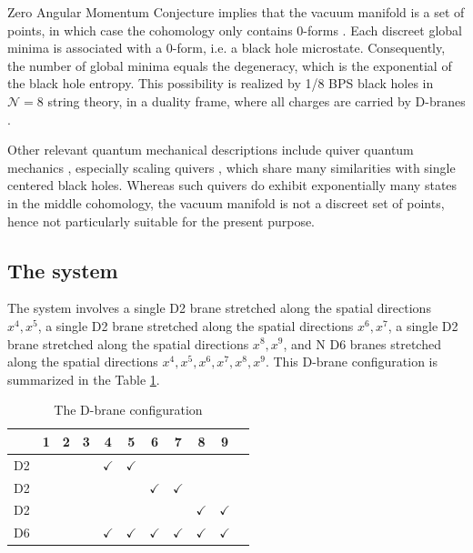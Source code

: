 \documentclass[12pt,a4paper]{JHEP3}
\begin{document}
Zero Angular Momentum Conjecture implies that the vacuum manifold is a set of points, in which case the cohomology only contains 0-forms%
. 
Each discreet global minima is associated with a 0-form, i.e. a black hole microstate.
 Consequently,  the number of global minima equals the degeneracy, which is the exponential of the black hole entropy. This possibility is realized by 1/8 BPS black holes in $\mathcal{N}=8$ string theory, in a duality frame, where all charges are carried by D-branes \cite{Chowdhury:2014yca, Chowdhury:2015gbk}.

Other relevant quantum mechanical descriptions include quiver quantum mechanics \cite{Denef:2002ru}, especially scaling quivers \cite{Bena:2012hf, Chattopadhyaya:2021rdi, Beaujard:2021fsk}, which share many similarities with single centered black holes. Whereas such quivers do exhibit exponentially many states in the middle cohomology, the vacuum manifold is not a discreet set of points, hence not particularly suitable for the present purpose. 
\subsection{The system}
%
The system involves a single D2 brane stretched along the spatial directions $x^4, x^5$, a single D2 brane stretched along the spatial directions $x^6, x^7$, a single D2 brane stretched along the spatial directions $x^8, x^9$,  and N D6 branes stretched along the spatial directions $x^4, x^5,x^6, x^7,x^8, x^9$. This D-brane configuration is summarized in the Table \ref{Dconfig}.
%
\begin{table}[htb]
\begin{center}
\begin{tabular}{|c||c|c|c|c|c|c|c|c|c|c}
\hline
& 1 & 2 & 3 & 4 & 5 & 6 & 7 & 8 & 9 \\
\hline
D2 &  &  &  & $\checkmark$ & $\checkmark$ &  &  &  &  \\
\hline
D2 &  &  &  &  &  & $\checkmark$ & $\checkmark$ &  &  \\
\hline
D2 &  &  &  &  &  &  &  & $\checkmark$ & $\checkmark$ \\
\hline
D6 &  &  &  & $\checkmark$ & $\checkmark$ & $\checkmark$ & $\checkmark$ & $\checkmark$ & $\checkmark$ \\
\hline
\end{tabular}
\end{center}
\caption{The D-brane configuration}\label{Dconfig}
\end{table}
%
\end{document}
